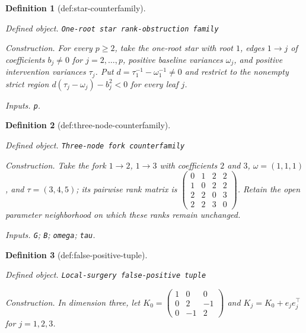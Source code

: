 \documentclass{article}
\newtheorem{definition}{Definition}
\begin{document}
\begin{definition}[def:star-counterfamily]\label{def:star-counterfamily}
\par\smallskip\noindent\emph{Defined object.} \texttt{One-\allowbreak{}root star rank-\allowbreak{}obstruction family}
\par\smallskip\noindent\emph{Construction.} For every \(p\ge2\), take the one-root star with root \(1\), edges \(1\to j\) of coefficients \(b_j\neq0\) for \(j=2,\ldots,p\), positive baseline variances \(\omega_j\), and positive intervention variances \(\tau_j\). Put \(d=\tau_1^{-1}-\omega_1^{-1}\neq0\) and restrict to the nonempty strict region \(d(\tau_j-\omega_j)-b_j^2<0\) for every leaf \(j\).
\par\smallskip\noindent\emph{Inputs.} \texttt{p}.
\end{definition}

\begin{definition}[def:three-node-counterfamily]\label{def:three-node-counterfamily}
\par\smallskip\noindent\emph{Defined object.} \texttt{Three-\allowbreak{}node fork counterfamily}
\par\smallskip\noindent\emph{Construction.} Take the fork \(1\to2\), \(1\to3\) with coefficients \(2\) and \(3\), \(\omega=(1,1,1)\), and \(\tau=(3,4,5)\); its pairwise rank matrix is \(\begin{pmatrix}0&1&2&2\\1&0&2&2\\2&2&0&3\\2&2&3&0\end{pmatrix}\). Retain the open parameter neighborhood on which these ranks remain unchanged.
\par\smallskip\noindent\emph{Inputs.} \texttt{G}; \texttt{B}; \texttt{omega}; \texttt{tau}.
\end{definition}

\begin{definition}[def:false-positive-tuple]\label{def:false-positive-tuple}
\par\smallskip\noindent\emph{Defined object.} \texttt{Local-\allowbreak{}surgery false-\allowbreak{}positive tuple}
\par\smallskip\noindent\emph{Construction.} In dimension three, let \(K_0=\begin{pmatrix}1&0&0\\0&2&-1\\0&-1&2\end{pmatrix}\) and \(K_j=K_0+e_je_j^{\top}\) for \(j=1,2,3\).
\end{definition}
\end{document}
